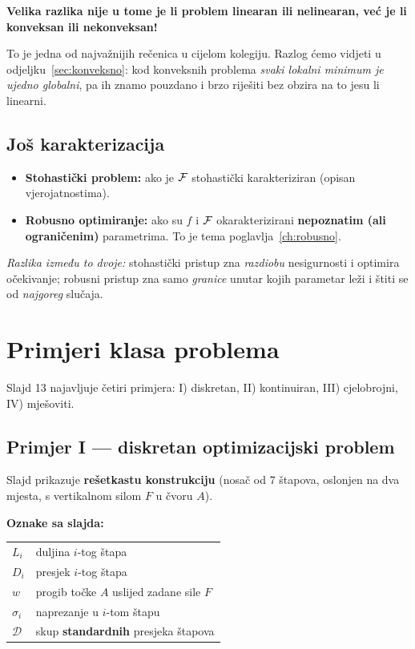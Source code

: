 \begin{teorem}
\textbf{Velika razlika nije u tome je li problem linearan ili nelinearan, već
je li konveksan ili nekonveksan!}
\end{teorem}

To je jedna od najvažnijih rečenica u cijelom kolegiju. Razlog ćemo vidjeti u
odjeljku~\ref{sec:konveksno}: kod konveksnih problema \emph{svaki lokalni
minimum je ujedno globalni}, pa ih znamo pouzdano i brzo riješiti bez obzira na
to jesu li linearni.

\subsection{Još karakterizacija}

\begin{itemize}
  \item \textbf{Stohastički problem:} ako je $\mathcal{F}$ stohastički
        karakteriziran (opisan vjerojatnostima).
  \item \textbf{Robusno optimiranje:} ako su $f$ i $\mathcal{F}$ okarakterizirani
        \textbf{nepoznatim (ali ograničenim)} parametrima. To je tema
        poglavlja~\ref{ch:robusno}.
\end{itemize}

\emph{Razlika između to dvoje:} stohastički pristup zna \emph{razdiobu}
nesigurnosti i optimira očekivanje; robusni pristup zna samo \emph{granice}
unutar kojih parametar leži i štiti se od \emph{najgoreg} slučaja.

\section{Primjeri klasa problema}

Slajd 13 najavljuje četiri primjera: I) diskretan, II) kontinuiran,
III) cjelobrojni, IV) mješoviti.

\subsection{Primjer I --- diskretan optimizacijski problem}

Slajd prikazuje \textbf{rešetkastu konstrukciju} (nosač od 7 štapova,
oslonjen na dva mjesta, s vertikalnom silom $F$ u čvoru $A$).

\textbf{Oznake sa slajda:}
\begin{center}
\begin{tabular}{ll}
\toprule
$L_i$ & duljina $i$-tog štapa \\
$D_i$ & presjek $i$-tog štapa \\
$w$ & progib točke $A$ uslijed zadane sile $F$ \\
$\sigma_i$ & naprezanje u $i$-tom štapu \\
$\mathcal{D}$ & skup \textbf{standardnih} presjeka štapova \\
\bottomrule
\end{tabular}
\end{center}

